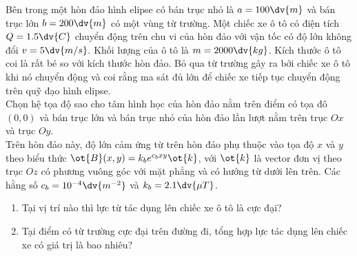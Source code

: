     
    \begin{vd}
    Bên trong một hòn đảo hình elipse có bán trục nhỏ là $a=100\dv{m}$ và bán trục lớn $b=200\dv{m}$ có một vùng từ trường. Một chiếc xe ô tô có điện tích $Q=1.5\dv{C}$ chuyển động trên chu vi của hòn đảo với vận tốc có độ lớn không đổi $v=5\dv{m/s}$. Khối lượng của ô tô là $m=2000\dv{kg}$. Kích thước ô tô coi là rất bé so với kích thước hòn đảo. Bỏ qua từ trường gây ra bởi chiếc xe ô tô khi nó chuyển động và coi rằng ma sát đủ lớn để chiếc xe tiếp tục chuyển động trên quỹ đạo hình elipse.\\
    Chọn hệ tọa độ sao cho tâm hình học của hòn đảo nằm trên điểm có tọa đô $(0,0)$ và bán trục lớn và bán trục nhỏ của hòn đảo lần lượt nằm trên trục $Ox$ và trục $Oy$.\\
    Trên hòn đảo này, độ lớn cảm ứng từ trên hòn đảo phụ thuộc vào tọa độ $x$ và $y$ theo biểu thức $\ot{B}(x,y)=k_be^{c_bxy}\ot{k}$, với $\ot{k}$ là vector đơn vị theo trục $Oz$ có phương vuông góc với mặt phẳng và có hướng từ dưới lên trên. Các hằng số $c_b=10^{-4}\dv{m^{-2}}$ và $k_b=2.1\dv{\mu T}$.
    \begin{enumerate}[1)]
        \setlength\itemsep{0pt}
        \item Tại vị trí nào thì lực từ tác dụng lên chiếc xe ô tô là cực đại?
        \item Tại điểm có từ trường cực đại trên đường đi, tổng hợp lực tác dụng lên chiếc xe có giá trị là bao nhiêu?
    \end{enumerate}
    \end{vd}
